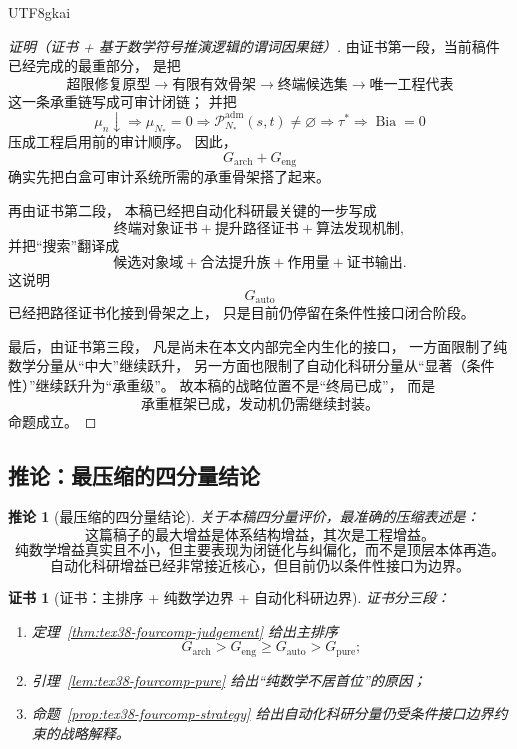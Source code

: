 \documentclass[12pt]{article}
\newtheorem{corollary}{推论}[section]
\newtheorem{Certificate}{证书}[section]
\newcommand{\Bia}{\operatorname{Bia}}
\begin{document}
\begin{CJK*}{UTF8}{gkai}
\begin{proof}[证明（证书 + 基于数学符号推演逻辑的谓词因果链）]
由证书第一段，当前稿件已经完成的最重部分，
是把
\[
  \text{超限修复原型}
  \to
  \text{有限有效骨架}
  \to
  \text{终端候选集}
  \to
  \text{唯一工程代表}
\]
这一条承重链写成可审计闭链；
并把
\[
  \mu_n\downarrow
  \Rightarrow
  \mu_{N_\ast}=0
  \Rightarrow
  \mathcal P^{\mathrm{adm}}_{N_\ast}(s,t)\neq\varnothing
  \Rightarrow
  \tau^\ast
  \Rightarrow
  \Bia=0
\]
压成工程启用前的审计顺序。
因此，
\[
  G_{\mathrm{arch}}+G_{\mathrm{eng}}
\]
确实先把白盒可审计系统所需的承重骨架搭了起来。

再由证书第二段，
本稿已经把自动化科研最关键的一步写成
\[
  \text{终端对象证书}
  +
  \text{提升路径证书}
  +
  \text{算法发现机制},
\]
并把“搜索”翻译成
\[
  \text{候选对象域}
  +
  \text{合法提升族}
  +
  \text{作用量}
  +
  \text{证书输出}.
\]
这说明
\[
  G_{\mathrm{auto}}
\]
已经把路径证书化接到骨架之上，
只是目前仍停留在条件性接口闭合阶段。

最后，由证书第三段，
凡是尚未在本文内部完全内生化的接口，
一方面限制了纯数学分量从“中大”继续跃升，
另一方面也限制了自动化科研分量从“显著（条件性）”继续跃升为“承重级”。
故本稿的战略位置不是“终局已成”，
而是
\[
  \text{承重框架已成，发动机仍需继续封装。}
\]
命题成立。
\end{proof}

\subsection{推论：最压缩的四分量结论}
\label{subsec:tex38-fourcomp-corollary}

\begin{corollary}[最压缩的四分量结论]
\label{cor:tex38-fourcomp-compressed}
关于本稿四分量评价，最准确的压缩表述是：
\[
  \boxed{
    \text{这篇稿子的最大增益是体系结构增益，其次是工程增益。}
  }
\]
\[
  \boxed{
    \text{纯数学增益真实且不小，但主要表现为闭链化与纠偏化，而不是顶层本体再造。}
  }
\]
\[
  \boxed{
    \text{自动化科研增益已经非常接近核心，但目前仍以条件性接口为边界。}
  }
\]
\end{corollary}

\begin{Certificate}[证书：主排序 + 纯数学边界 + 自动化科研边界]
\label{cert:tex38-fourcomp-compressed}
证书分三段：
\begin{enumerate}
  \item 定理~\ref{thm:tex38-fourcomp-judgement} 给出主排序
  \[
    G_{\mathrm{arch}}
    >
    G_{\mathrm{eng}}
    \ge
    G_{\mathrm{auto}}
    >
    G_{\mathrm{pure}};
  \]
  \item 引理~\ref{lem:tex38-fourcomp-pure} 给出“纯数学不居首位”的原因；
  \item 命题~\ref{prop:tex38-fourcomp-strategy} 给出自动化科研分量仍受条件接口边界约束的战略解释。
\end{enumerate}
\end{Certificate}


\end{CJK*}
\end{document}
